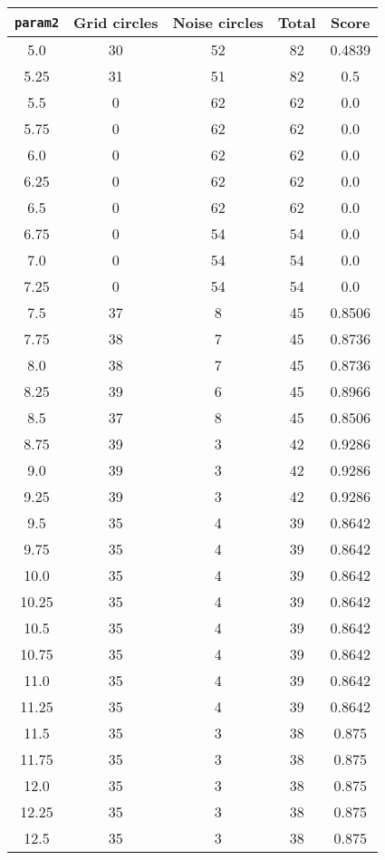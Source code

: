 \documentclass[letterpaper, 12pt]{article}
\begin{document}
\begin{longtable}{|c|c|c|c|c|}
\hline
\textbf{\texttt{param2}} & \textbf{Grid circles} & \textbf{Noise circles} & \textbf{Total} & \textbf{Score} \\
\hline
5.0 & 30 & 52 & 82 & 0.4839 \\
\hline
5.25 & 31 & 51 & 82 & 0.5 \\
\hline
5.5 & 0 & 62 & 62 & 0.0 \\
\hline
5.75 & 0 & 62 & 62 & 0.0 \\
\hline
6.0 & 0 & 62 & 62 & 0.0 \\
\hline
6.25 & 0 & 62 & 62 & 0.0 \\
\hline
6.5 & 0 & 62 & 62 & 0.0 \\
\hline
6.75 & 0 & 54 & 54 & 0.0 \\
\hline
7.0 & 0 & 54 & 54 & 0.0 \\
\hline
7.25 & 0 & 54 & 54 & 0.0 \\
\hline
7.5 & 37 & 8 & 45 & 0.8506 \\
\hline
7.75 & 38 & 7 & 45 & 0.8736 \\
\hline
8.0 & 38 & 7 & 45 & 0.8736 \\
\hline
8.25 & 39 & 6 & 45 & 0.8966 \\
\hline
8.5 & 37 & 8 & 45 & 0.8506 \\
\hline
8.75 & 39 & 3 & 42 & 0.9286 \\
\hline
9.0 & 39 & 3 & 42 & 0.9286 \\
\hline
9.25 & 39 & 3 & 42 & 0.9286 \\
\hline
9.5 & 35 & 4 & 39 & 0.8642 \\
\hline
9.75 & 35 & 4 & 39 & 0.8642 \\
\hline
10.0 & 35 & 4 & 39 & 0.8642 \\
\hline
10.25 & 35 & 4 & 39 & 0.8642 \\
\hline
10.5 & 35 & 4 & 39 & 0.8642 \\
\hline
10.75 & 35 & 4 & 39 & 0.8642 \\
\hline
11.0 & 35 & 4 & 39 & 0.8642 \\
\hline
11.25 & 35 & 4 & 39 & 0.8642 \\
\hline
11.5 & 35 & 3 & 38 & 0.875 \\
\hline
11.75 & 35 & 3 & 38 & 0.875 \\
\hline
12.0 & 35 & 3 & 38 & 0.875 \\
\hline
12.25 & 35 & 3 & 38 & 0.875 \\
\hline
12.5 & 35 & 3 & 38 & 0.875 \\

\end{longtable}
\end{document}
